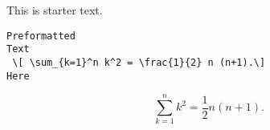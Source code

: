 \documentclass{article}
\begin{document}
This is starter text.\\

\begin{verbatim}
Preformatted
Text
 \[ \sum_{k=1}^n k^2 = \frac{1}{2} n (n+1).\]
Here
\end{verbatim}

 \[ \sum_{k=1}^n k^2 = \frac{1}{2} n (n+1).\]
\end{document}
